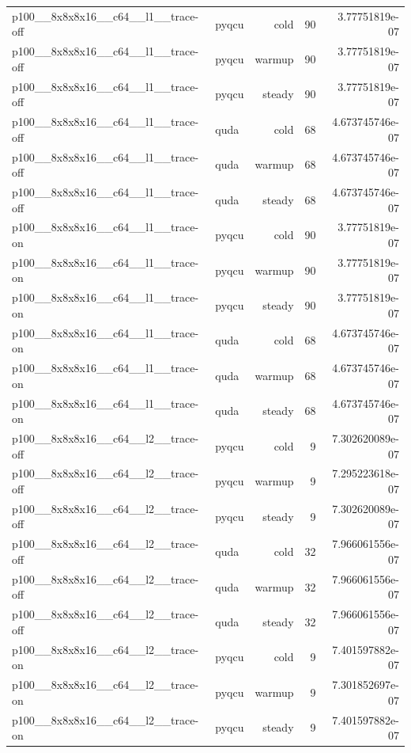 \begin{table}[htbp]
\begin{tabular}{@{}llrrr@{}}
p100\_\_8x8x8x16\_\_c64\_\_l1\_\_trace-off & pyqcu & cold & 90 & 3.77751819e-07 \\
p100\_\_8x8x8x16\_\_c64\_\_l1\_\_trace-off & pyqcu & warmup & 90 & 3.77751819e-07 \\
p100\_\_8x8x8x16\_\_c64\_\_l1\_\_trace-off & pyqcu & steady & 90 & 3.77751819e-07 \\
p100\_\_8x8x8x16\_\_c64\_\_l1\_\_trace-off & quda & cold & 68 & 4.673745746e-07 \\
p100\_\_8x8x8x16\_\_c64\_\_l1\_\_trace-off & quda & warmup & 68 & 4.673745746e-07 \\
p100\_\_8x8x8x16\_\_c64\_\_l1\_\_trace-off & quda & steady & 68 & 4.673745746e-07 \\
p100\_\_8x8x8x16\_\_c64\_\_l1\_\_trace-on & pyqcu & cold & 90 & 3.77751819e-07 \\
p100\_\_8x8x8x16\_\_c64\_\_l1\_\_trace-on & pyqcu & warmup & 90 & 3.77751819e-07 \\
p100\_\_8x8x8x16\_\_c64\_\_l1\_\_trace-on & pyqcu & steady & 90 & 3.77751819e-07 \\
p100\_\_8x8x8x16\_\_c64\_\_l1\_\_trace-on & quda & cold & 68 & 4.673745746e-07 \\
p100\_\_8x8x8x16\_\_c64\_\_l1\_\_trace-on & quda & warmup & 68 & 4.673745746e-07 \\
p100\_\_8x8x8x16\_\_c64\_\_l1\_\_trace-on & quda & steady & 68 & 4.673745746e-07 \\
p100\_\_8x8x8x16\_\_c64\_\_l2\_\_trace-off & pyqcu & cold & 9 & 7.302620089e-07 \\
p100\_\_8x8x8x16\_\_c64\_\_l2\_\_trace-off & pyqcu & warmup & 9 & 7.295223618e-07 \\
p100\_\_8x8x8x16\_\_c64\_\_l2\_\_trace-off & pyqcu & steady & 9 & 7.302620089e-07 \\
p100\_\_8x8x8x16\_\_c64\_\_l2\_\_trace-off & quda & cold & 32 & 7.966061556e-07 \\
p100\_\_8x8x8x16\_\_c64\_\_l2\_\_trace-off & quda & warmup & 32 & 7.966061556e-07 \\
p100\_\_8x8x8x16\_\_c64\_\_l2\_\_trace-off & quda & steady & 32 & 7.966061556e-07 \\
p100\_\_8x8x8x16\_\_c64\_\_l2\_\_trace-on & pyqcu & cold & 9 & 7.401597882e-07 \\
p100\_\_8x8x8x16\_\_c64\_\_l2\_\_trace-on & pyqcu & warmup & 9 & 7.301852697e-07 \\
p100\_\_8x8x8x16\_\_c64\_\_l2\_\_trace-on & pyqcu & steady & 9 & 7.401597882e-07 \\

\end{tabular}
\end{table}
